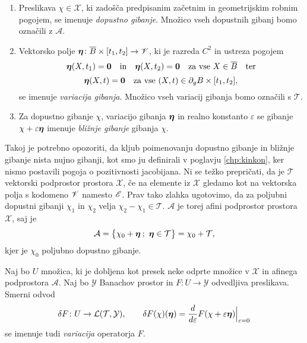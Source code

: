 \begin{definicija}
	\begin{enumerate}
		\item Preslikava $\chi\in\mathcal{X}$, ki zadošča predpisanim začetnim in geometrijskim robnim pogojem,
			se imenuje \emph{dopustno gibanje}. Množico vseh dopustnih gibanj bomo označili z $\mathcal{A}$.
		\item Vektorsko polje $\boldsymbol \eta\colon\overline{B}\times [t_1,t_2]\to\mathscr V$, ki je razreda $C^2$ in
			ustreza pogojem
			\[ \vek{\eta}(X,t_1)=\vek{0}\quad \textrm{in} \quad\vek{\eta}(X,t_2)=\vek{0}\quad \textrm{za vse}\ X\in\overline{B}\quad\textrm{ter} \]
			\[ \vek{\eta}(X,t)=\vek{0}\quad \textrm{za vse}\ (X,t)\in \partial_g B\times [t_1,t_2], \]
			se imenuje \emph{variacija gibanja}. Množico vseh variacij gibanja bomo ozna\-čili s $\mathcal{T}$.
		\item Za dopustno gibanje $\chi$, variacijo gibanja $\boldsymbol \eta$ in realno konstanto $\varepsilon$ se gibanje
			$\chi+\varepsilon\boldsymbol \eta$ imenuje \emph{bližnje gibanje} gibanja $\chi$.
	\end{enumerate}
\end{definicija}

Takoj je potrebno opozoriti, da kljub poimenovanju dopustno gibanje in bližnje gibanje nista nujno gibanji,
kot smo ju definirali v poglavju \ref{chp:kinkon}, ker nismo postavili pogoja o pozitivnosti jacobijana.
Ni se težko prepričati, da je $\mathcal{T}$ vektorski podprostor prostora $\mathcal{X}$, če na elemente iz $\mathcal{X}$
gledamo kot na vektorska polja s kodomeno $\mathscr V$ namesto $\mathscr E$.
Prav tako zlahka ugotovimo, da za poljubni dopustni gibanji $\chi_1$ in $\chi_2$
velja $\chi_2-\chi_1\in\mathcal{T}$. $\mathcal{A}$ je torej afini podprostor prostora $\mathcal{X}$, saj je
\[ \mathcal{A}=\big\{ \chi_0+\boldsymbol \eta\: ;\ \boldsymbol \eta\in\mathcal{T} \big\}=\chi_0+\mathcal{T}, \]
kjer je $\chi_0$ poljubno dopustno gibanje.

\begin{definicija}
	Naj bo $U$ množica, ki je dobljena kot presek neke odprte množice v $\mathcal{X}$ in afinega
	podprostora $\mathcal{A}$. Naj bo $\mathcal{Y}$ Banachov prostor in $F\colon U\to\mathcal{Y}$
	odvedljiva preslikava. Smerni odvod
	\[
		\delta F\colon U\to\mathcal L(\mathcal{T},\mathcal{Y}),\qquad
		\delta F(\chi)(\boldsymbol \eta)=\frac{d}{d\varepsilon}F(\chi+\varepsilon\boldsymbol \eta)\Big|_{\varepsilon=0}
	\]
	se imenuje tudi \emph{variacija} operatorja $F$.
\end{definicija}

